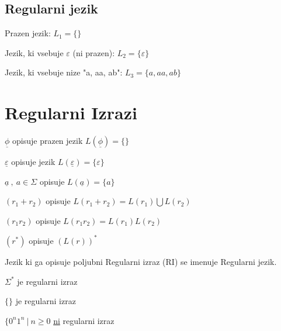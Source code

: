 \documentclass[10pt,a4paper,oneside]{book}
\begin{document}
\subsection*{Regularni jezik}
\begin{primeri} 
\item Prazen jezik: $L_1 =\lbrace \rbrace$
\item Jezik, ki vsebuje $\varepsilon$ (ni prazen): $L_2 = \lbrace \varepsilon \rbrace$
\item Jezik, ki vsebuje nize "a, aa, ab": $L_3 = \lbrace a, aa, ab \rbrace$
\end{primeri} 

\section{Regularni Izrazi}
\begin{items}
	\item $ \underline{\phi} $ opisuje prazen jezik $ L(\underline{\phi})= \lbrace \rbrace $
	\item $ \underline{ \varepsilon } $ opisuje jezik $ L(\underline{ \varepsilon })= \lbrace \varepsilon\rbrace $
	\item $ \underline{a} \ , \ a \in \Sigma $ opisuje $ L ( \underline{a} ) = \lbrace a \rbrace $
	\item $ (r_1 + r_2) $ opisuje $ L(r_1 + r_2) = L(r_1) \bigcup L( r_2) $
	\item $ (r_1  r_2) $ opisuje $ L(r_1  r_2) = L(r_1) L( r_2) $
	\item $ (r^*) $ opisuje $ (L(r))^* $
\end{items}

Jezik ki ga opisuje poljubni Regularni izraz (RI) se imenuje Regularni jezik.
\begin{items}
	\item $\Sigma^* $ je regularni izraz
	\item $ \lbrace \rbrace $ je regularni izraz
	\item $ \lbrace 0^n 1^n \ | \ n \geqslant 0 $ \underline{ni} regularni izraz
\end{items}
	
\end{document}
